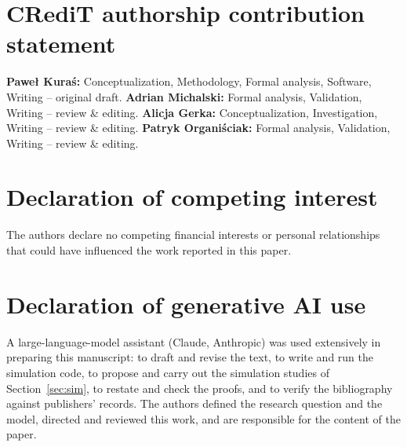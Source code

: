 \documentclass[10pt,twocolumn]{article}
\theoremstyle{definition}
\begin{document}
\section*{CRediT authorship contribution statement}
\textbf{Pawe\l{} Kura\'s:} Conceptualization, Methodology, Formal analysis, Software, Writing -- original draft. \textbf{Adrian Michalski:} Formal analysis, Validation, Writing -- review \& editing. \textbf{Alicja Gerka:} Conceptualization, Investigation, Writing -- review \& editing. \textbf{Patryk Organi\'sciak:} Formal analysis, Validation, Writing -- review \& editing.

\section*{Declaration of competing interest}
The authors declare no competing financial interests or personal relationships that could have influenced the work reported in this paper.

\section*{Declaration of generative AI use}
A large-language-model assistant (Claude, Anthropic) was used extensively in preparing this manuscript: to draft and revise the text, to write and run the simulation code, to propose and carry out the simulation studies of Section~\ref{sec:sim}, to restate and check the proofs, and to verify the bibliography against publishers' records. The authors defined the research question and the model, directed and reviewed this work, and are responsible for the content of the paper.
\end{document}
